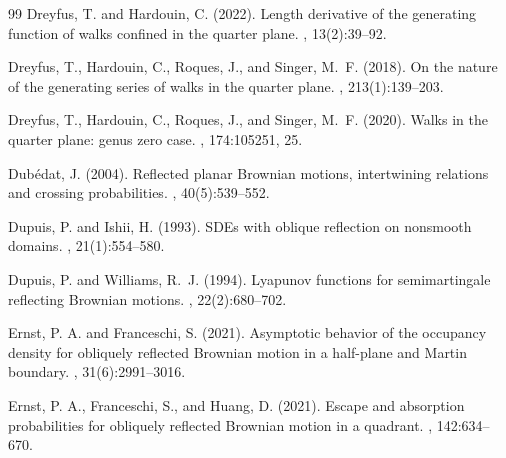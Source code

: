 \documentclass[11pt]{article}
\theoremstyle{definition}
\begin{document}
\begin{thebibliography}{99}
Dreyfus, T. and Hardouin, C. (2022).
\newblock Length derivative of the generating function of walks confined in the
  quarter plane.
, 13(2):39--92.

Dreyfus, T., Hardouin, C., Roques, J., and Singer, M.~F. (2018).
\newblock On the nature of the generating series of walks in the quarter plane.
, 213(1):139--203.

Dreyfus, T., Hardouin, C., Roques, J., and Singer, M.~F. (2020).
\newblock Walks in the quarter plane: genus zero case.
, 174:105251, 25.

Dub{\'e}dat, J. (2004).
\newblock Reflected planar {B}rownian motions, intertwining relations and
  crossing probabilities.
, 40(5):539--552.

Dupuis, P. and Ishii, H. (1993).
\newblock SDEs with oblique reflection on nonsmooth domains.
, 21(1):554--580.


Dupuis, P. and Williams, R.~J. (1994).
\newblock Lyapunov functions for semimartingale reflecting {Brownian} motions.
, 22(2):680--702.


Ernst, P. A. and Franceschi, S. (2021).
\newblock Asymptotic behavior of the occupancy density for obliquely reflected Brownian motion in a half-plane and Martin boundary.
, 31(6):2991--3016.

Ernst, P. A., Franceschi, S., and Huang, D. (2021).
\newblock Escape and absorption probabilities for obliquely reflected Brownian motion in a quadrant.
, 142:634--670.


\end{thebibliography}
\end{document}
